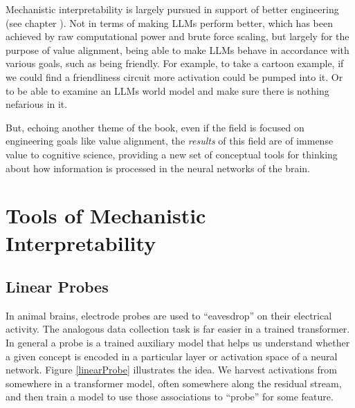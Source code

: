 Mechanistic interpretability is largely pursued in support of better engineering (see chapter ). Not in terms of making LLMs perform better, which has been achieved by raw computational power and brute force scaling, but largely for the purpose of value alignment, being able to make LLMs behave in accordance with various goals, such as being friendly. For example, to take a cartoon example, if we could find a friendliness circuit more activation could be pumped into it. Or to be able to examine an LLMs world model and make sure there is nothing nefarious in it. 

But, echoing another theme of the book, even if the field is focused on engineering goals like value alignment, the \emph{results} of this field are of immense value to cognitive science, providing a new set of conceptual tools for thinking about how information is processed in the neural networks of the brain.

\section{Tools of Mechanistic Interpretability}

\subsection{Linear Probes}

In animal brains, electrode probes are used to ``eavesdrop'' on their electrical activity. The analogous data collection task is far easier in a trained transformer.  In general a probe is a trained auxiliary model that helps us understand whether a given concept is encoded in a particular layer or activation space of a neural network. Figure \ref{linearProbe} illustrates the idea. We harvest activations from somewhere in a transformer model, often somewhere along the residual stream, and then train a model to use those associations to ``probe'' for some feature.  

